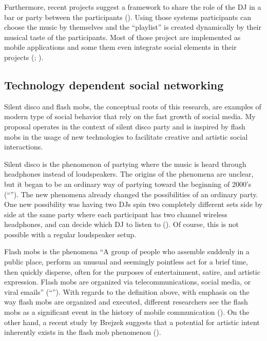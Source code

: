 Furthermore, recent projects suggest a framework to share the role of the DJ in a bar or party between the participants (\cite{web:shaw}).
Using those systems participants can choose the music by themselves and the ``playlist'' is created dynamically by their musical taste of the participants.
Most of those project are implemented as mobile applications and some them even integrate social elements in their projects (\cite{web:playmysong}; \cite{web:lammers}).

\subsection{Technology dependent social networking}

Silent disco and flash mobs, the conceptual roots of this research, are examples of modern type of social behavior that rely on the fast growth of social media. My proposal operates in the context of silent disco party and is inspired by flash mobs in the usage of new technologies to facilitate creative and artistic social interactions.

Silent disco is the phenomenon of partying where the music is heard through headphones instead of loudspeakers.
The origins of the phenomena are unclear, but it began to be an ordinary way of partying toward the beginning of 2000's (``'').
The new phenomena already changed the possibilities of an ordinary party.
One new possibility was having two DJs spin two completely different sets side by side at the same party where each participant has two channel wireless headphones, and can decide which DJ to listen to (\cite{web:headphonedisco}).
Of course, this is not possible with a regular loudspeaker setup.

Flash mobs is the phenomena ``A group of people who assemble suddenly in a public place, perform an unusual and seemingly pointless act for a brief time, then quickly disperse, often for the purposes of entertainment, satire, and artistic expression. Flash mobs are organized via telecommunications, social media, or viral emails'' (``'').
With regards to the definition above, with emphasis on the way flash mobs are organized and executed, different researchers see the flash mobs as a significant event in the history of mobile communication (\cite{nicholson05}).
On the other hand, a recent study by Brejzek suggests that a potential for artistic intent inherently exists in the flash mob phenomenon (\cite*{brejzek10}).

